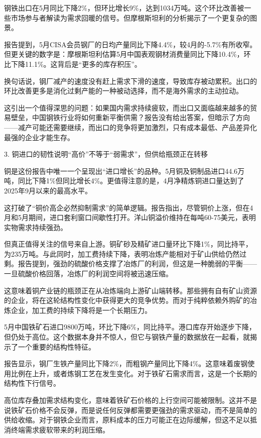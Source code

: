 \documentclass[11pt]{ctexart}
\begin{document}
钢铁出口在5月同比下降2\%，但环比增长9\%，达到1034万吨。这个环比改善被一些市场参与者解读为需求回暖的信号。但摩根斯坦利的分析揭示了一个更复杂的图景。

报告提到，5月CISA会员钢厂的日均产量同比下降4.4\%，较4月的-5.7\%有所收窄。但更关键的数字是：摩根斯坦利估算5月中国表观钢材消费量同比下降10.4\%，环比下降11.1\%。这背后是“更多的库存积压”。

换句话说，钢厂减产的速度没有赶上需求下滑的速度，导致库存被动累积。出口的环比改善更多是消化过剩产能的一种被动选择，而不是海外需求的主动拉动。

这引出一个值得深思的问题：如果国内需求持续疲软，而出口又面临越来越多的贸易壁垒，中国钢铁行业将如何重新平衡供需？报告没有给出答案，但暗示了方向——减产可能还需要继续，而出口的竞争将更加激烈，只有成本最低、产品差异化最强的企业才能生存。

3. 铜进口的韧性说明“高价”不等于“弱需求”，但供给瓶颈正在转移

铜是这份报告中唯一一个呈现出“进口增长”的品种。5月铜及铜制品进口44.6万吨，同比下降1\%但同比增长4\%。更值得注意的是，4月净精炼铜进口量达到了2025年9月以来的最高水平。

这打破了“铜价高企必然抑制需求”的简单逻辑。报告指出，尽管铜价上涨，但在4月和5月期间，进口套利窗口间歇性打开。洋山铜溢价维持在每吨60-75美元，表明实物需求持续强劲。

但真正值得关注的信号来自上游。铜矿砂及精矿进口量环比下降1\%，同比持平，为235万吨。与此同时，加工费持续下降，表明冶炼产能相对于矿山供给仍然过剩。报告提到，强劲的硫酸价格支撑了冶炼厂的利润，但这是一种脆弱的平衡——一旦硫酸价格回落，冶炼厂的利润空间将被迅速压缩。

这意味着铜产业链的瓶颈正在从冶炼端向上游矿山端转移。那些拥有自有矿山资源的企业，将在这轮结构性变化中获得更大的竞争优势。而对于纯粹依赖外购矿的冶炼企业，加工费的持续下降将是一个长期压力。

5月中国铁矿石进口9800万吨，环比下降6\%，同比持平。港口库存开始逐步下降，但仍处于高位。这个数据本身并不惊人，但它与钢铁产量的数据放在一起看，就揭示了一个重要的结构性特征。

报告显示，钢厂生铁产量同比下降2\%，而粗钢产量同比下降4\%。这意味着废钢使用比例在上升，或者炼钢工艺在发生变化。对于铁矿石需求而言，这是一个长期的结构性下行信号。

高位库存叠加需求结构变化，意味着铁矿石价格的上行空间可能被限制。这并不是说铁矿石价格不会反弹，而是说任何反弹都需要更强劲的需求驱动，而不是简单的供给收缩。对于钢铁企业而言，原料成本的压力可能正在边际缓解，但这不足以抵消终端需求疲软带来的利润压缩。
\end{document}
